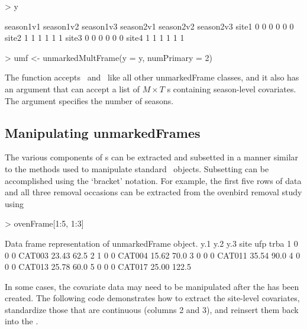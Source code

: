 \documentclass[article,shortnames]{jss}
\newcommand{\rlang}{\proglang{R}}
\newcommand{\scovs}{\code{siteCovs}}
\newcommand{\ocovs}{\code{obsCovs}}
\begin{document}
{\begin{Schunk}
\begin{Sinput}
> y
\end{Sinput}
\begin{Soutput}
      season1v1 season1v2 season1v3 season2v1 season2v2 season2v3
site1         0         0         0         0         0         0
site2         1         1         1         1         1         1
site3         0         0         0         0         0         0
site4         1         1         1         1         1         1
\end{Soutput}
\begin{Sinput}
> umf <- unmarkedMultFrame(y = y, numPrimary = 2)
\end{Sinput}
\end{Schunk}

The function  accepts \scovs\ and \ocovs\ like all 
other unmarkedFrame classes, and it also has an argument 
that can accept a list of $M \times T$ s containing 
season-level covariates. The  argument specifies the 
number of seasons.

\subsection{Manipulating unmarkedFrames}
\label{sec:manip}

The various components of s can be extracted and 
subsetted in a manner similar to the methods used to manipulate standard 
\rlang\ objects.  Subsetting can be accomplished using the `bracket' 
notation. For example, the first five rows of data and all three 
removal occasions can be extracted from the ovenbird removal study using

\begin{Schunk}
\begin{Sinput}
> ovenFrame[1:5, 1:3]
\end{Sinput}
\begin{Soutput}
Data frame representation of unmarkedFrame object.
  y.1 y.2 y.3   site   ufp  trba
1   0   0   0 CAT003 23.43  62.5
2   1   0   0 CAT004 15.62  70.0
3   0   0   0 CAT011 35.54  90.0
4   0   0   0 CAT013 25.78  60.0
5   0   0   0 CAT017 25.00 122.5
\end{Soutput}
\end{Schunk}

In some cases, the covariate data may need to be manipulated after the 
 has been created. The following code demonstrates 
how to extract the site-level covariates, standardize those that are 
continuous (columns 2 and 3), and reinsert them back into the 
.

}
\end{document}

